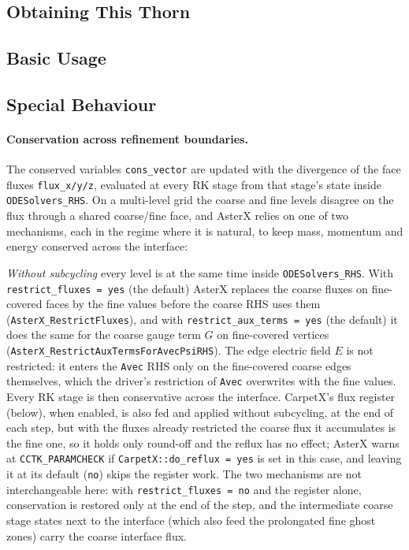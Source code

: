 \subsection{Obtaining This Thorn}

\subsection{Basic Usage}

\subsection{Special Behaviour}

\paragraph{Conservation across refinement boundaries.}
The conserved variables \texttt{cons\_vector} are updated with the divergence
of the face fluxes \texttt{flux\_x/y/z}, evaluated at every RK stage from
that stage's state inside \texttt{ODESolvers\_RHS}. On a multi-level grid the
coarse and fine levels disagree on the flux through a shared coarse/fine
face, and AsterX relies on one of two mechanisms, each in the regime where it
is natural, to keep mass, momentum and energy conserved across the interface:

\emph{Without subcycling} every level is at the same time inside
\texttt{ODESolvers\_RHS}. With \texttt{restrict\_fluxes = yes} (the
default) AsterX replaces the coarse fluxes on fine-covered faces by the fine
values before the coarse RHS uses them (\texttt{AsterX\_RestrictFluxes}), and
with \texttt{restrict\_aux\_terms = yes} (the default) it does the same for
the coarse gauge term $G$ on fine-covered vertices
(\texttt{AsterX\_RestrictAuxTermsForAvecPsiRHS}). The edge electric field $E$
is not restricted: it enters the \texttt{Avec} RHS only on the fine-covered
coarse edges themselves, which the driver's restriction of \texttt{Avec}
overwrites with the fine values.
Every RK stage is then conservative across the interface. CarpetX's flux
register (below), when enabled, is also fed and applied without subcycling,
at the end of each step, but with the fluxes already restricted the coarse
flux it accumulates is the fine one, so it holds only round-off and the
reflux has no effect; AsterX warns at \texttt{CCTK\_PARAMCHECK} if
\texttt{CarpetX::do\_reflux = yes} is set in this case, and leaving it at its
default (\texttt{no}) skips the register work. The two mechanisms
are not interchangeable here: with \texttt{restrict\_fluxes = no} and the
register alone, conservation is restored only at the end of the step, and
the intermediate coarse stage states next to the interface (which also feed
the prolongated fine ghost zones) carry the coarse interface flux.

